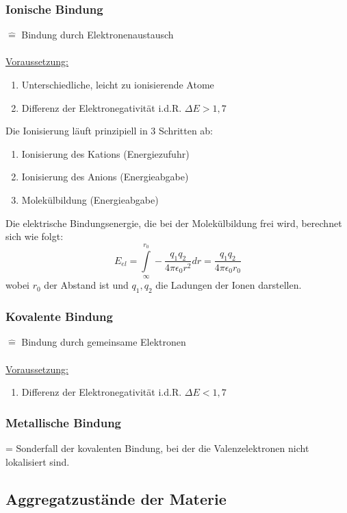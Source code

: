 \documentclass[a4paper,twocolumn,10pt]{article}
\begin{document}
\subsubsection{Ionische Bindung}
$\hat{=}$ Bindung durch Elektronenaustausch\\\\
\underline{Voraussetzung:}
\begin{enumerate}[label=$\bullet$]
\item Unterschiedliche, leicht zu ionisierende Atome
\item Differenz der Elektronegativität i.d.R. $\Delta E >1,7$
\end{enumerate}
Die Ionisierung läuft prinzipiell in 3 Schritten ab:
\begin{enumerate}
\item Ionisierung des Kations (Energiezufuhr)
\item Ionisierung des Anions (Energieabgabe)
\item Molekülbildung (Energieabgabe)
\end{enumerate}
Die elektrische Bindungsenergie, die bei der Molekülbildung frei wird, berechnet sich wie folgt:
\begin{equation*}
E_{el}=\int\limits_{\infty}^{r_0}-\frac{q_1q_2}{4\pi\epsilon_0r^2}dr=\frac{q_1q_2}{4\pi\epsilon_0r_0}
\end{equation*}
wobei $r_0$ der Abstand ist und $q_1,q_2$ die Ladungen der Ionen darstellen.

\subsubsection{Kovalente Bindung}
$\hat{=}$ Bindung durch gemeinsame Elektronen\\\\
\underline{Voraussetzung:}
\begin{enumerate}[label=$\bullet$]
\item Differenz der Elektronegativität i.d.R. $\Delta E < 1,7$
\end{enumerate}

\subsubsection{Metallische Bindung}
= Sonderfall der kovalenten Bindung, bei der die Valenzelektronen nicht lokalisiert sind.

\subsection{Aggregatzustände der Materie}
\end{document}
